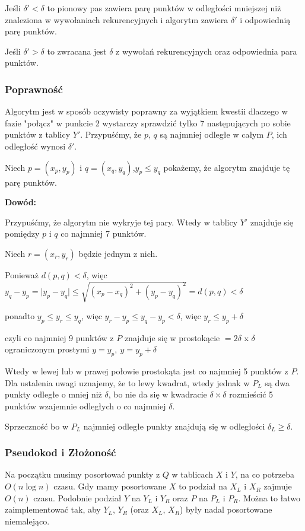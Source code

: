 \begin{itemize}
		Jeśli $\delta'<\delta$ to pionowy pas zawiera parę punktów w odległości mniejszej niż znaleziona w  wywołaniach rekurencyjnych i algorytm zawiera $\delta'$ i odpowiednią parę punktów.
		
		Jeśli $\delta'>\delta$ to zwracana jest $\delta$ z wywołań rekurencyjnych oraz odpowiednia para punktów.
\end{itemize}

\subsubsection{Poprawność}
Algorytm jest w sposób oczywisty poprawny za wyjątkiem kwestii dlaczego w fazie "połącz" w punkcie 2 wystarczy sprawdzić tylko 7 następujących po sobie punktów z tablicy $Y'$. Przypuśćmy, że $p$, $q$ są najmniej odległe w całym $P$, ich odległość wynosi $\delta'$.

Niech 
$p=(x_p,y_p)$ i $q=(x_q,y_q)$,\tab \tab $y_p \leq y_q$
pokażemy, że algorytm znajduje tę parę punktów.

\textbf{Dowód: }

Przypuśćmy, że algorytm nie wykryje tej pary. Wtedy w tablicy $Y'$ znajduje się pomiędzy $p$ i $q$ co najmniej 7 punktów.

Niech $r=(x_r,y_r)$ będzie jednym z nich.

Ponieważ $d(p,q)<\delta$, więc $y_q-y_p = \vert y_p - y_q \vert \leq \sqrt{(x_p-x_q)^2+(y_p-y_q)^2}=d(p,q)<\delta$

ponadto $y_p\leq y_r\leq y_q$, więc $y_r-y_p \leq y_q-y_p<\delta$, więc $y_r\leq y_p + \delta$

czyli co najmniej 9 punktów z $P$ znajduje się w prostokącie $=2\delta$ x $\delta$ ograniczonym prostymi $y=y_p,\ y=y_p+\delta$

Wtedy w lewej lub w prawej połowie prostokąta jest co najmniej 5 punktów z $P$. Dla ustalenia uwagi uznajemy, że to lewy kwadrat, wtedy jednak w $P_L$ są dwa punkty odległe o mniej niż $\delta$, bo nie da się w kwadracie $\delta \times \delta$ rozmieścić 5 punktów wzajemnie odległych o co najmniej $\delta$.

Sprzeczność bo w $P_L$ najmniej odległe punkty znajdują się w odległości $\delta_L \geq \delta$.

\subsubsection{Pseudokod i Złożoność}
Na początku musimy posortować punkty z $Q$ w tablicach $X$ i $Y$, na co potrzeba $O(n \log n)$ czasu. Gdy mamy posortowane $X$ to podział na $X_L$ i $X_R$ zajmuje $O(n)$ czasu. Podobnie podział $Y$ na $Y_L$ i $Y_R$ oraz $P$ na $P_L$ i $P_R$. Można to łatwo zaimplementować tak, aby $Y_L$, $Y_R$ (oraz $X_L$, $X_R$) były nadal posortowane niemalejąco.


